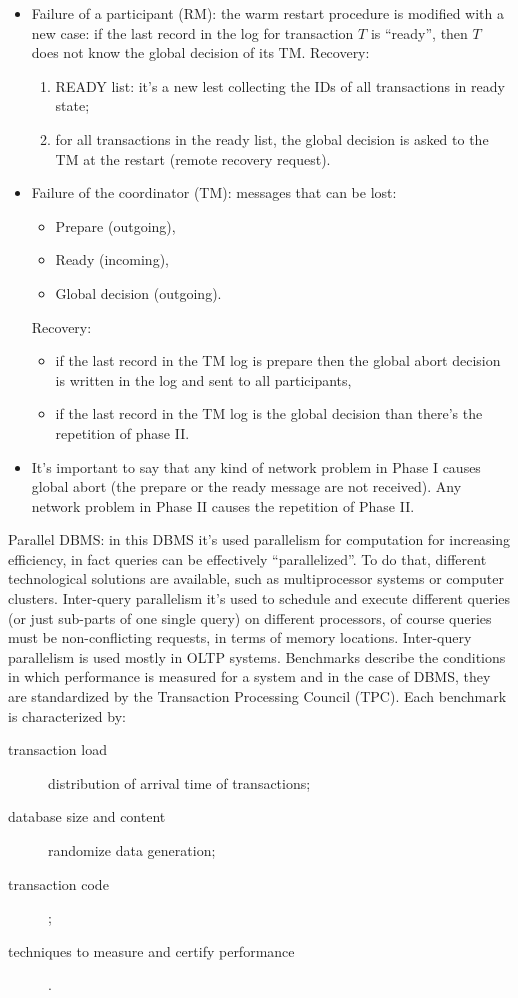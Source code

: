 \begin{itemize}
	\item Failure of a participant (RM): the warm restart procedure is modified with a new case: if the last record in the log for transaction $T$ is ``ready'', then $T$ does not know the global decision of its TM.
	Recovery:
	\begin{enumerate}
		\item READY list: it's a new lest collecting the IDs of all transactions in ready state;
		\item for all transactions in the ready list, the global decision is asked to the TM at the restart (remote recovery request).
	\end{enumerate}
	\item Failure of the coordinator (TM): messages that can be lost:
	\begin{itemize}
		\item Prepare (outgoing),
		\item Ready (incoming),
		\item Global decision (outgoing).
	\end{itemize}
	Recovery:
	\begin{itemize}
		\item if the last record in the TM log is prepare then the global abort decision is written in the log and sent to all participants,
		\item if the last record in the TM log is the global decision than there's the repetition of phase II.
	\end{itemize}
	\item It's important to say that any kind of network problem in Phase I causes global abort (the prepare or the ready message are not received). Any network problem in Phase II causes the repetition of Phase II.
\end{itemize}

Parallel DBMS: in this DBMS it's used parallelism for computation for increasing efficiency, in fact queries can be effectively ``parallelized''.
To do that, different technological solutions are available, such as multiprocessor systems or computer clusters.
Inter-query parallelism it's used to schedule and execute different queries (or just sub-parts of one single query) on different processors, of course queries must be non-conflicting requests, in terms of memory locations.
Inter-query parallelism is used mostly in OLTP systems.
Benchmarks describe the conditions in which performance is measured for a system and in the case of DBMS, they are standardized by the Transaction Processing Council (TPC).
Each benchmark is characterized by:
\begin{description}
	\item[transaction load] distribution of arrival time of transactions;
	\item[database size and content] randomize data generation;
	\item[transaction code];
	\item[techniques to measure and certify performance].
\end{description}